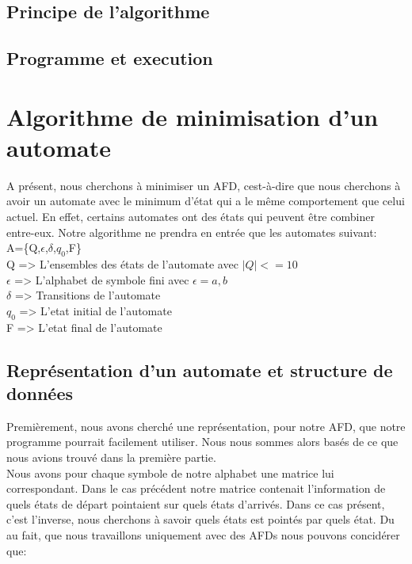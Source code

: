 \documentclass[a4paper]{article}
\begin{document}
\subsection{Principe de l'algorithme}
\subsection{Programme et execution}


\section{Algorithme de minimisation d'un automate}

A présent, nous cherchons à minimiser un AFD, cest-à-dire que nous
cherchons à avoir un automate avec le minimum d'état qui a le même
comportement que celui actuel. En effet, certains automates ont
des états qui peuvent être combiner entre-eux. Notre algorithme ne 
prendra en entrée que les automates suivant: \\

A=\{Q,$\epsilon$,$\delta$,$q_0$,F\}\\
Q => L'ensembles des états de l'automate avec $|Q|<=10$\\
$\epsilon$ => L'alphabet de symbole fini avec $\epsilon={a,b}$\\
$\delta$ => Transitions de l'automate\\
$q_0$ => L'etat initial de l'automate\\
F => L'etat final de l'automate\\



\subsection{Représentation d'un automate et structure de données}

Premièrement, nous avons cherché une représentation, pour notre
AFD, que notre programme pourrait facilement utiliser. Nous 
nous sommes alors basés de ce que nous avions trouvé dans la 
première partie.\\
Nous avons pour chaque symbole de notre alphabet une matrice lui correspondant. Dans
le cas précédent notre matrice contenait l'information de quels états
de départ pointaient sur quels états d'arrivés. Dans ce cas présent,
c'est l'inverse, nous cherchons à savoir quels états est pointés par
quels état. Du au fait, que nous travaillons uniquement avec des AFDs
nous pouvons concidérer que:\\
\end{document}
